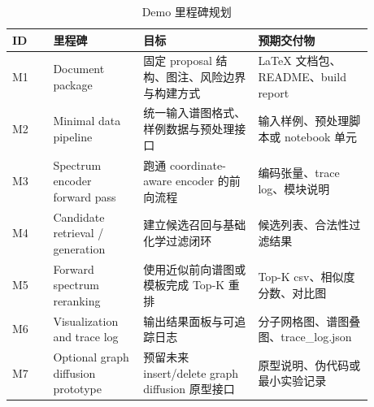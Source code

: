 \begin{table}[htbp]
  \centering
  \caption{Demo 里程碑规划}
  \label{tab:milestones}
  \small
  \renewcommand{\arraystretch}{1.2}
  \begin{tabular}{>{\raggedright\arraybackslash}p{0.10\linewidth} >{\raggedright\arraybackslash}p{0.22\linewidth} >{\raggedright\arraybackslash}p{0.28\linewidth} >{\raggedright\arraybackslash}p{0.28\linewidth}}
    \toprule
    ID & 里程碑 & 目标 & 预期交付物 \\
    \midrule
    M1 & Document package & 固定 proposal 结构、图注、风险边界与构建方式 & LaTeX 文档包、README、build report \\
    M2 & Minimal data pipeline & 统一输入谱图格式、样例数据与预处理接口 & 输入样例、预处理脚本或 notebook 单元 \\
    M3 & Spectrum encoder forward pass & 跑通 coordinate-aware encoder 的前向流程 & 编码张量、trace log、模块说明 \\
    M4 & Candidate retrieval / generation & 建立候选召回与基础化学过滤闭环 & 候选列表、合法性过滤结果 \\
    M5 & Forward spectrum reranking & 使用近似前向谱图或模板完成 Top-K 重排 & Top-K csv、相似度分数、对比图 \\
    M6 & Visualization and trace log & 输出结果面板与可追踪日志 & 分子网格图、谱图叠图、trace\_log.json \\
    M7 & Optional graph diffusion prototype & 预留未来 insert/delete graph diffusion 原型接口 & 原型说明、伪代码或最小实验记录 \\
    \bottomrule
  \end{tabular}
\end{table}
